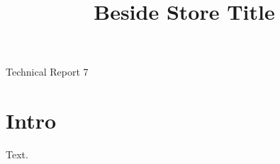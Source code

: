 \documentclass{article}
\title{Beside Store Title}
\begin{document}
\begin{titlepage}
\centering Technical Report 7\par
\end{titlepage}
\begin{center}{\huge \@title\par}\end{center}
\section{Intro}
Text.
\end{document}
